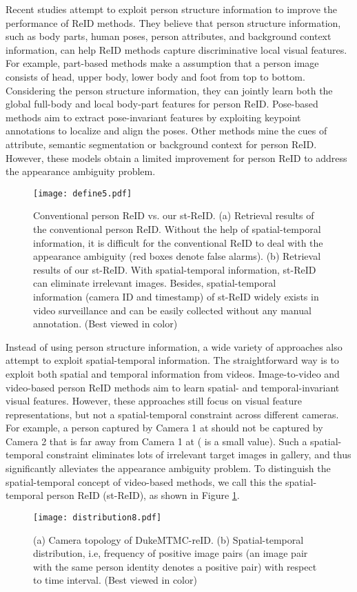 \documentclass[letterpaper]{article} \usepackage{aaai19}  \usepackage{times}  \usepackage{helvet}  \usepackage{courier}  \usepackage{url}  \usepackage{graphicx}  \usepackage{subfig}
\begin{document}
Recent studies attempt to exploit person structure information to improve the performance of ReID methods. They believe that person structure information, such as body parts, human poses, person attributes, and background context information, can help ReID methods capture discriminative local visual features. For example, part-based methods \cite{Li_2017_CVPR,Zhao_2017_ICCV} make a assumption that a person image consists of head, upper body, lower body and foot from top to bottom. Considering the person structure information, they can jointly learn both the global full-body and local body-part features for person ReID. Pose-based methods \cite{Su2017ICCV,Zhao_2017_CVPR} aim to extract pose-invariant features by exploiting keypoint annotations to localize and align the poses. Other methods mine the cues of attribute, semantic segmentation or background context \cite{Kalayeh_2018_CVPR,Song_2018_CVPR} for person ReID. However, these models obtain a limited improvement for person ReID to address the appearance ambiguity problem.
\begin{figure}[!t]
\centering
\texttt{[image: define5.pdf]}
\caption{Conventional person ReID vs. our st-ReID. (a) Retrieval results of the conventional person ReID. Without the help of spatial-temporal information, it is difficult for the conventional ReID to deal with the appearance ambiguity (red boxes denote false alarms). (b) Retrieval results of our st-ReID. With spatial-temporal information, st-ReID can eliminate irrelevant images. Besides, spatial-temporal information (camera ID and timestamp) of st-ReID widely exists in video surveillance and can be easily collected without any manual annotation. (Best viewed in color)}
\label{fig:define}
\end{figure}

Instead of using person structure information, a wide variety of approaches also attempt to exploit spatial-temporal information. The straightforward way is to exploit both spatial and temporal information from videos. Image-to-video and video-based person ReID methods \cite{wang2017tcsvt,Li_2018_CVPR} aim to learn spatial- and temporal-invariant visual features. However, these approaches still focus on visual feature representations, but not a spatial-temporal constraint across different cameras. For example, a person captured by Camera 1 at  should not be captured by Camera 2 that is far away from Camera 1 at  ( is a small value). Such a spatial-temporal constraint eliminates lots of irrelevant target images in gallery, and thus significantly alleviates the appearance ambiguity problem. To distinguish the spatial-temporal concept of video-based methods, we call this the spatial-temporal person ReID (st-ReID), as shown in Figure \ref{fig:define}.
\begin{figure*}[!t]
\centering
\texttt{[image: distribution8.pdf]}
\caption{(a) Camera topology of DukeMTMC-reID. (b) Spatial-temporal distribution, i.e, frequency of positive image pairs (an image pair with the same person identity denotes a positive pair) with respect to time interval. (Best viewed in color)}
\label{fig:distribution}
\end{figure*}
\end{document}
